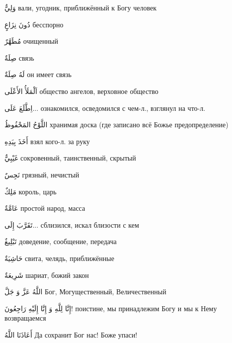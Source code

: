 \documentclass[a5paper]{article}
\newcommand\textstyleDropCaps[1]{#1}
\newcommand\textstyleCaptioncharacters[1]{#1}
\begin{document}
\textstyleCaptioncharacters{وَلِيٌّ }\textstyleDropCaps{вали, угодник, при­ближённый к Богу человек‎}

\textstyleCaptioncharacters{دُونَ نِزَاعٍ }\textstyleDropCaps{бесспорно‎}

\textstyleCaptioncharacters{مُطَهَّرٌ }\textstyleDropCaps{очищенный‎}

\textstyleCaptioncharacters{صِلَةٌ }\textstyleDropCaps{связь‎}

\textstyleCaptioncharacters{لَهُ صِلَةٌ }\textstyleDropCaps{он имеет связь‎}

\textstyleCaptioncharacters{اَلْمَلَأُ الأَعْلَى }\textstyleDropCaps{общество ангелов, верховное общество‎}

\textstyleCaptioncharacters{اِطَّلَعَ عَلَى... }\textstyleDropCaps{ознакомил­ся, осведомился с чем-л., взглянул на что-л.‎}

\textstyleCaptioncharacters{اللَّوْحُ المَحْفُوظُ }\textstyleDropCaps{храни­мая доска (где записано всё Божье предопределение)‎}

\textstyleCaptioncharacters{أَخَذَ بِيَدِهِ }\textstyleDropCaps{взял кого-л. за руку‎}

\textstyleCaptioncharacters{غَيْبِيٌّ }\textstyleDropCaps{сокровенный, та­инственный, скрытый‎}

\textstyleCaptioncharacters{نَجِسٌ }\textstyleDropCaps{грязный, нечистый‎}

\textstyleCaptioncharacters{مَلِكٌ }\textstyleDropCaps{король, царь‎}

\textstyleCaptioncharacters{عَامَّةٌ }\textstyleDropCaps{простой народ, мас­са‎}

\textstyleCaptioncharacters{تَقَرَّبَ إِلَى... }\textstyleDropCaps{сблизился, искал близости с кем‎}

\textstyleCaptioncharacters{تَبْلِيغٌ }\textstyleDropCaps{доведение, сообще­ние, передача‎}

\textstyleCaptioncharacters{حَاشِيَةٌ }\textstyleDropCaps{свита, челядь, при­ближённые‎}

\textstyleCaptioncharacters{شَرِيعَةٌ }\textstyleDropCaps{шариат, божий за­кон ‎}

\textstyleCaptioncharacters{اللَّهُ عَزَّ وَ جَلَّ }\textstyleDropCaps{Бог, Мо­гущественный, Величественный‎}

\textstyleCaptioncharacters{إِنَّا لِلَّهِ وَ إِنَّا إِلَيْهِ رَاجِعُونَ! }\textstyleDropCaps{поистине, мы принадлежим Богу и мы к Нему возвращаемся‎}

\textstyleCaptioncharacters{أَعَاذَنَا اللَّهُ }\textstyleDropCaps{Да сохранит Бог нас! Боже упаси!‎}
\end{document}
